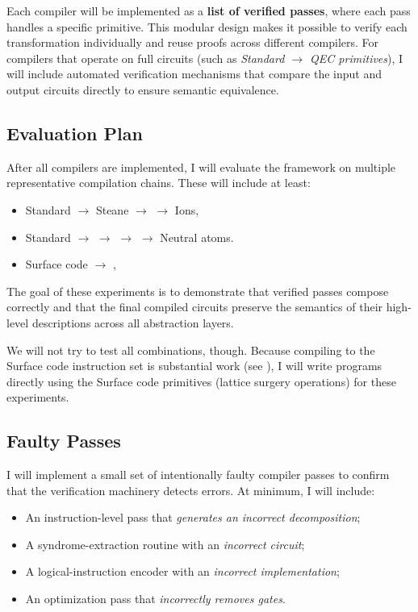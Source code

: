 Each compiler will be implemented as a \textbf{list of verified passes}, where each pass handles a specific primitive.  
This modular design makes it possible to verify each transformation individually and reuse proofs across different compilers.  
For compilers that operate on full circuits (such as \emph{Standard $\rightarrow$ QEC primitives}), I will include automated verification mechanisms that compare the input and output circuits directly to ensure semantic equivalence.

\subsection{Evaluation Plan}

After all compilers are implemented, I will evaluate the framework on multiple representative compilation chains.  
These will include at least:
\begin{itemize}
    \item Standard $\rightarrow$ Steane $\rightarrow$  $\rightarrow$ Ions,
    \item Standard $\rightarrow$  $\rightarrow$  $\rightarrow$   $\rightarrow$ Neutral atoms.
    \item Surface code  $\rightarrow$  ,
\end{itemize}

The goal of these experiments is to demonstrate that verified passes compose correctly and that the final compiled circuits preserve the semantics of their high-level descriptions across all abstraction layers.

We will not try to test all combinations, though. 
Because compiling to the Surface code instruction set is substantial work (see \cite{litinski2019game}), I will write programs directly using the Surface code primitives (lattice surgery operations) for these experiments.


\subsection{Faulty Passes}

I will implement a small set of intentionally faulty compiler passes to confirm that the verification machinery detects errors. At minimum, I will include:

\begin{itemize}
    \item An instruction-level pass that \emph{generates an incorrect decomposition};
    \item A syndrome-extraction routine with an \emph{incorrect circuit};
    \item A logical-instruction encoder with an \emph{incorrect implementation};
    \item An optimization pass that \emph{incorrectly removes gates}.
\end{itemize}




